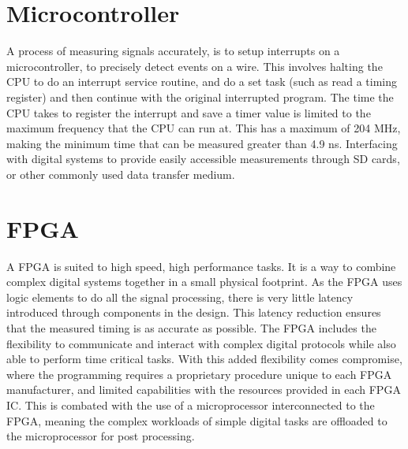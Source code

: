\section{Microcontroller}

\par A process of measuring signals accurately, is to setup interrupts on a microcontroller, to precisely detect events 
on a wire.  This involves halting the CPU to do an interrupt service routine, and do a set task (such as read a 
timing register) and then continue with the original interrupted program. The time the CPU takes to register the 
interrupt and save a timer value is limited to the maximum frequency that the CPU can run at. This has a maximum of 
204 MHz, making the minimum time that can be measured greater than 4.9 ns. Interfacing with digital systems to 
provide easily accessible measurements through SD cards, or other commonly used data transfer medium.

\section{FPGA}

\par A FPGA is suited to high speed, high performance tasks. It is a way to combine complex digital systems together in 
a small physical footprint. As the FPGA uses logic elements to do all the signal processing, there is very little 
latency introduced through components in the design. This latency reduction ensures that the measured timing is as 
accurate as possible. The FPGA includes the flexibility to communicate and interact with complex digital protocols 
while also able to perform time critical tasks. With this added flexibility comes compromise, where the programming 
requires a proprietary procedure unique to each FPGA manufacturer, and limited capabilities with the resources 
provided in each FPGA IC. This is combated with the use of a microprocessor interconnected to the FPGA, meaning the 
complex workloads of simple digital tasks are offloaded to the microprocessor for post processing.
